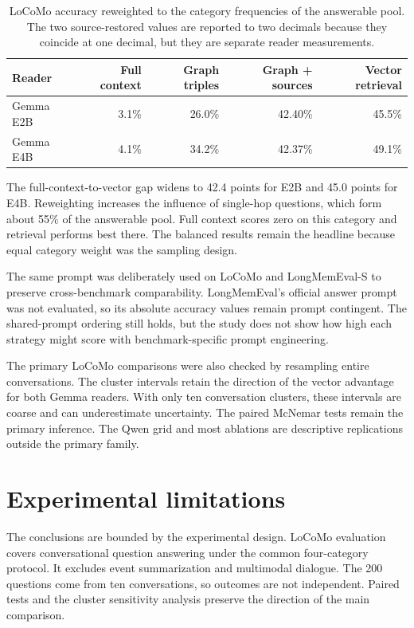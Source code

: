 \begin{table}[htbp]
  \centering
  \small
  \setlength{\tabcolsep}{7pt}
  \begin{tabular}{lrrrr}
    \toprule
    Reader & Full context & Graph triples & Graph + sources & Vector retrieval \\
    \midrule
    Gemma E2B & 3.1\% & 26.0\% & 42.40\% & 45.5\% \\
    Gemma E4B & 4.1\% & 34.2\% & 42.37\% & 49.1\% \\
    \bottomrule
  \end{tabular}
  \caption{LoCoMo accuracy reweighted to the category frequencies of the answerable pool. The two
           source-restored values are reported to two decimals because they coincide at one decimal,
           but they are separate reader measurements.}
  \label{tab:ch4_reweighted}
\end{table}

The full-context-to-vector gap widens to 42.4 points for E2B and 45.0 points for E4B. Reweighting
increases the influence of single-hop questions, which form about 55\% of the answerable pool. Full
context scores zero on this category and retrieval performs best there. The balanced results remain
the headline because equal category weight was the sampling design.

The same prompt was deliberately used on LoCoMo and LongMemEval-S to preserve cross-benchmark
comparability. LongMemEval's official answer prompt was not evaluated, so its absolute accuracy
values remain prompt contingent. The shared-prompt ordering still holds, but the study does not show
how high each strategy might score with benchmark-specific prompt engineering.

The primary LoCoMo comparisons were also checked by resampling entire conversations. The
cluster intervals retain the direction of the vector advantage for both Gemma readers. With only ten
conversation clusters, these intervals are coarse and can underestimate uncertainty. The paired
McNemar tests remain the primary inference. The Qwen grid and most ablations are descriptive
replications outside the primary family.

\section{Experimental limitations}
\label{sec:ch4_limitations}

The conclusions are bounded by the experimental design. LoCoMo evaluation covers conversational
question answering under the common four-category protocol. It excludes event summarization and
multimodal dialogue. The 200 questions come from ten conversations, so outcomes are not independent.
Paired tests and the cluster sensitivity analysis preserve the direction of the main comparison.

